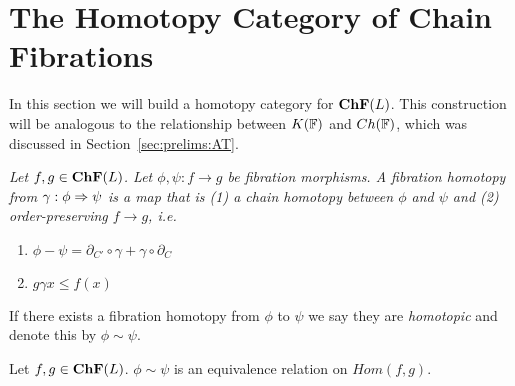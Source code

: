 
\section{The Homotopy Category of Chain Fibrations}\label{sec:homotopy}


  In this section we will build a homotopy category for ${\bf ChF}(L)$.  This construction will be analogous to the relationship between $K({\mathbb{F}})$ and $Ch({\mathbb{F}})$, which was discussed in Section~\ref{sec:prelims:AT}.

\begin{defn}
{\em
Let $f,g\in {\bf ChF}(L)$.  Let $\phi,\psi:f\to g$ be fibration morphisms.  A {\em fibration homotopy} from $\gamma:\phi\Rightarrow \psi$ is a map that is (1) a chain homotopy between $\phi$ and $\psi$ and (2) order-preserving $f\to g$, i.e.
\begin{enumerate}
\item $\phi - \psi = \partial_{C'}\circ \gamma + \gamma\circ \partial_C$
\item $g\gamma x \leq f(x)$
\end{enumerate}
}
\end{defn}



If there exists a fibration homotopy from $\phi$ to $\psi$ we say they are {\em homotopic} and denote this by $\phi\sim \psi$.  

\begin{prop}
 Let $f,g\in {\bf ChF}(L)$.  $\phi \sim \psi$ is an equivalence relation on $Hom(f,g)$.
\end{prop}
%
%
%
%
%
%


